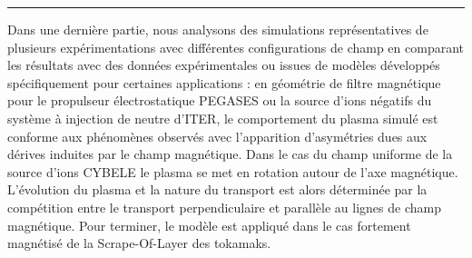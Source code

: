 \begin{refsection}
\begin{center}
\rule{0.6\textwidth}{1pt}
\end{center}	
	
		Dans une dernière partie, nous analysons des simulations représentatives de
		plusieurs expérimentations avec différentes configurations de champ en comparant
		les résultats avec des données expérimentales ou issues de modèles développés
		spécifiquement pour certaines applications :
		en géométrie de filtre magnétique pour le propulseur électrostatique PEGASES
		ou la source d'ions négatifs du système à injection de neutre d'ITER, le
		comportement du plasma simulé est conforme aux phénomènes observés avec
		l’apparition d’asymétries dues aux dérives induites par le champ magnétique.
		Dans le cas du champ uniforme de la source d'ions CYBELE le plasma se met en
		rotation autour de l'axe magnétique. L'évolution du plasma et la nature du
		transport est alors déterminée par la compétition entre le transport
		perpendiculaire et parallèle au lignes de champ magnétique. Pour terminer, le
		modèle est appliqué dans le cas fortement magnétisé de la Scrape-Of-Layer des
		tokamaks.
		


%
%
\end{refsection}

